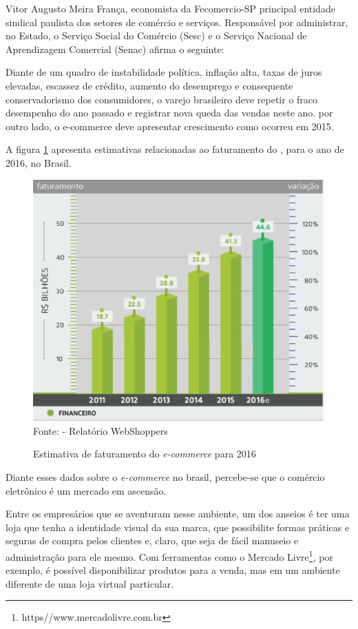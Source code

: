 \documentclass[a4paper,12pt]{monografia}
\begin{document}
Vitor Augusto Meira França, economista da Fecomercio-SP principal entidade sindical paulista dos setores de comércio e serviços. Responsável por administrar, no Estado, o Serviço Social do Comércio (Sesc) e o Serviço Nacional de Aprendizagem Comercial (Senac) afirma o seguinte:

\begin{citacao}
Diante de um quadro de instabilidade política, inflação alta, taxas de juros elevadas, escassez de crédito, aumento do desemprego e consequente conservadorismo dos consumidores, o varejo brasileiro deve repetir o fraco desempenho do ano passado e registrar nova queda das vendas neste ano. por outro lado, o e-commerce deve apresentar crescimento como ocorreu em 2015. \cite{webshoppers}
\end{citacao}

A figura \ref{figura:estimativa:faturamento} apresenta estimativas relacionadas ao faturamento do , para o ano de 2016, no Brasil.

\begin{figure}[H]
\centering
\caption{Estimativa de faturamento do \textit{e-commerce} para 2016}
\centering
\includegraphics[width=12cm]{img/webshoppers/estimativa-faturamento.eps}\\
\small{Fonte:  - Relatório WebShoppers}
\label{figura:estimativa:faturamento}
\end{figure}

Diante esses dados sobre o \textit{e-commerce} no brasil, percebe-se que o comércio eletrônico é um mercado em ascensão.

Entre os empresários que se aventuram nesse ambiente, um dos anseios é ter uma loja que tenha a identidade visual da sua marca, que possibilite formas práticas e seguras de compra pelos clientes e, claro, que seja de fácil manuseio e administração para ele mesmo. Com ferramentas como o Mercado Livre\footnote{https//www.mercadolivre.com.br}, por exemplo, é possível disponibilizar produtos para a venda, mas em um ambiente diferente de uma loja virtual particular.
\end{document}
